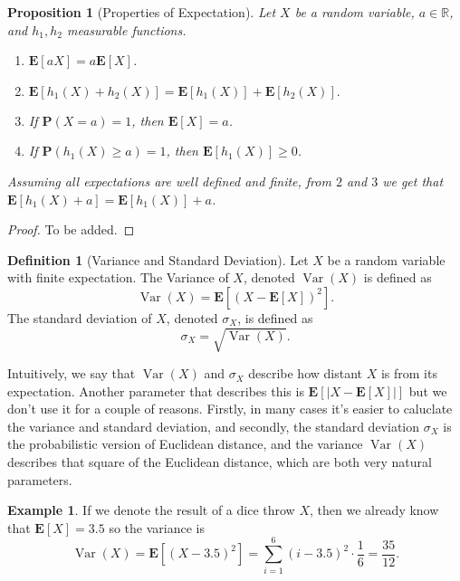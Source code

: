 \documentclass[11pt,a4paper]{article}
\theoremstyle{definition}
\newtheorem{definition}{Definition}[section]
\newtheorem{example}{Example}[section]
\theoremstyle{plain}
\newtheorem{proposition}[theorem]{Proposition}
\DeclareMathOperator{\Var}{Var}
\newcommand{\R}{\mathbb{R}}
\newcommand{\abs}[1]{\left\lvert #1\right\rvert}
\begin{document}
  \begin{proposition}[Properties of Expectation]
    Let $X$ be a random variable, $a \in \R$, and $h_1,h_2$ measurable
    functions.
    \begin{enumerate}
      \item $\mathbf E[aX] = a \mathbf E[X]$.
      \item $\mathbf E[h_1(X) + h_2(X)] = 
          \mathbf E[h_1(X)] + \mathbf E[h_2(X)].$
      \item If $\mathbf P(X=a) = 1$, then $\mathbf E[X] = a$.
      \item If $\mathbf P(h_1(X) \geq a) = 1$, then 
          $\mathbf E[h_1(X)] \geq 0$.
    \end{enumerate}
    Assuming all expectations are well defined and finite, from $2$ and $3$
    we get that $\mathbf E[h_{1}(X)+a]=\mathbf E[h_{1}(X)] + a$.
  \end{proposition}
  \begin{proof}
    To be added.
  \end{proof}

  \begin{definition}[Variance and Standard Deviation]
    Let $X$ be a random variable with finite expectation. The Variance of
    $X$, denoted $\Var(X)$ is defined as
    \[
      \Var(X) = \mathbf E\left[ (X - \mathbf E[X])^2 \right].
    \]
    The standard deviation of $X$, denoted $\sigma_X$, is defined as
    \[
      \sigma_X = \sqrt{\Var(X)}.
    \]
  \end{definition}
  
  Intuitively, we say that $\Var(X)$ and $\sigma_X$ describe how distant $X$
  is from its expectation. Another parameter that describes this is
  $\mathbf E\left[ \abs{X - \mathbf E[X]} \right]$ but we don't use it
  for a couple of reasons. Firstly, in many cases it's easier to caluclate
  the variance and standard deviation, and secondly, the standard deviation
  $\sigma_X$ is the probabilistic version of Euclidean distance, and the 
  variance $\Var(X)$ describes that square of the Euclidean distance, which
  are both very natural parameters.

  \begin{example}
    If we denote the result of a dice throw $X$, then we already know
    that $\mathbf E[X] = 3.5$ so the variance is
    \[
      \Var(X) =
      \mathbf E\left[ (X - 3.5)^2 \right] =
      \sum_{i=1}^{6} (i - 3.5)^2 \cdot \frac{1}{6} =
      \frac{35}{12}.
    \]
  \end{example}
\end{document}
